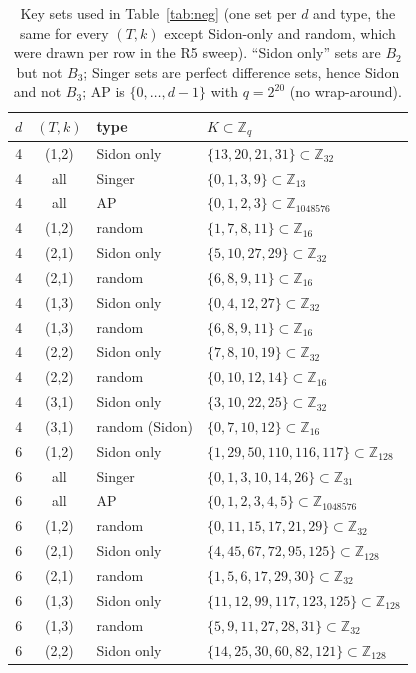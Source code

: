\documentclass[11pt]{article}
\newcommand{\Z}{\mathbb{Z}}
\theoremstyle{definition}
\theoremstyle{remark}
\begin{document}
\begin{table}[tbp]\centering\small
\caption{Key sets used in Table~\ref{tab:neg} (one set per $d$ and type, the same for every $(T,k)$ except Sidon-only and random, which were drawn per row in the R5 sweep). ``Sidon only'' sets are $B_2$ but not $B_3$; Singer sets are perfect difference sets, hence Sidon and not $B_3$; AP is $\{0,\dots,d-1\}$ with $q=2^{20}$ (no wrap-around).}\label{tab:negsets}
\begin{tabular}{cc ll}\toprule
$d$ & $(T,k)$ & type & $K\subset\Z_q$\\\midrule
4 & (1,2) & Sidon only & $\{13,20,21,31\}\subset\Z_{32}$\\
4 & all & Singer & $\{0,1,3,9\}\subset\Z_{13}$\\
4 & all & AP & $\{0,1,2,3\}\subset\Z_{1048576}$\\
4 & (1,2) & random & $\{1,7,8,11\}\subset\Z_{16}$\\
4 & (2,1) & Sidon only & $\{5,10,27,29\}\subset\Z_{32}$\\
4 & (2,1) & random & $\{6,8,9,11\}\subset\Z_{16}$\\
4 & (1,3) & Sidon only & $\{0,4,12,27\}\subset\Z_{32}$\\
4 & (1,3) & random & $\{6,8,9,11\}\subset\Z_{16}$\\
4 & (2,2) & Sidon only & $\{7,8,10,19\}\subset\Z_{32}$\\
4 & (2,2) & random & $\{0,10,12,14\}\subset\Z_{16}$\\
4 & (3,1) & Sidon only & $\{3,10,22,25\}\subset\Z_{32}$\\
4 & (3,1) & random (Sidon) & $\{0,7,10,12\}\subset\Z_{16}$\\
\midrule
6 & (1,2) & Sidon only & $\{1,29,50,110,116,117\}\subset\Z_{128}$\\
6 & all & Singer & $\{0,1,3,10,14,26\}\subset\Z_{31}$\\
6 & all & AP & $\{0,1,2,3,4,5\}\subset\Z_{1048576}$\\
6 & (1,2) & random & $\{0,11,15,17,21,29\}\subset\Z_{32}$\\
6 & (2,1) & Sidon only & $\{4,45,67,72,95,125\}\subset\Z_{128}$\\
6 & (2,1) & random & $\{1,5,6,17,29,30\}\subset\Z_{32}$\\
6 & (1,3) & Sidon only & $\{11,12,99,117,123,125\}\subset\Z_{128}$\\
6 & (1,3) & random & $\{5,9,11,27,28,31\}\subset\Z_{32}$\\
6 & (2,2) & Sidon only & $\{14,25,30,60,82,121\}\subset\Z_{128}$\\

\end{tabular}
\end{table}
\end{document}
